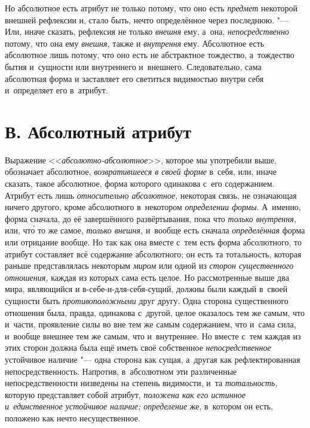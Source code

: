 Но абсолютное есть атрибут не только потому, что оно есть
{\em предмет} некоторой внешней рефлексии и, стало
быть, нечто определённое через последнюю. "--- Или, иначе сказать, рефлексия
не только {\em внешня} ему, а~она,
{\em непосредственно} потому, что она ему
{\em внешня,} также и
{\em внутрення} ему. Абсолютное есть абсолютное лишь
потому, что оно есть не абстрактное тождество, а~тождество бытия и~сущности
или внутреннего и~внешнего. Следовательно, сама абсолютная форма и
заставляет его светиться видимостью внутри себя и~определяет его в~атрибут.


\section[В. Абсолютный атрибут]{В. Абсолютный атрибут}

Выражение <<{\em абсолютно-абсолютное}>>, которое мы употребили
выше, обозначает абсолютное, {\em возвратившееся в
своей форме} в~себя, или, иначе сказать, такое абсолютное, форма которого
одинакова с~его содержанием. Атрибут есть лишь
{\em относительно абсолютное,} некоторая связь, не
означающая ничего другого, кроме абсолютного в~некотором
{\em определении формы}. А~именно, форма сначала, до её
завершённого развёртывания, пока что {\em только
внутрення,} или, чт\'{о} то же самое, {\em только внешня,}
и~вообще есть сначала {\em определённая} форма или
отрицание вообще. Но так как она вместе с~тем есть форма абсолютного, то
атрибут составляет всё содержание абсолютного; он есть та тотальность,
которая раньше представлялась некоторым {\em миром} или
одной из {\em сторон существенного отношения,} каждая
из которых сама есть целое. Но рассмотренные выше два мира, являющийся и
в-себе-и-для-себя-сущий, должны были каждый в~своей сущности быть
{\em противоположными} друг другу. Одна сторона
существенного отношения была, правда, одинакова с~другой, целое оказалось
тем же самым, что и~части, проявление силы во вне тем же самым содержанием,
что и~сама сила, и~вообще внешнее тем же самым, что и~внутреннее. Но вместе
с~тем каждая из этих сторон должна была ещё иметь своё собственное
{\em непосредственное} устойчивое наличие "--- одна
сторона как сущая, а~другая как рефлектированная непосредственность.
Напротив, в~абсолютном эти различенные непосредственности низведены на
степень видимости, и~та {\em тотальность,} которую
представляет собой атрибут, {\em положена как его
истинное и~единственное устойчивое наличие; определение} же, в~котором он
есть, положено как нечто несущественное.

